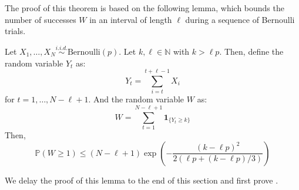 \documentclass{article}
\begin{document}
The proof of this theorem is based on the following lemma, which bounds the number of successes $W$ in an interval of length $\ell$ during a sequence of Bernoulli trials.  

\begin{lemma}\label{lem:bernoulli_trials}
    Let $X_1, \ldots, X_N \overset{i.i.d.}{\sim} \text{Bernoulli}(p)$. Let $k, \ell \in \mathbb{N}$ with $k > \ell p$. Then, define the random variable $Y_t$ as:
    \begin{equation*}
        Y_t = \sum_{i=t}^{t+\ell-1}X_i
    \end{equation*}
    for $t=1, \ldots, N-\ell+1$. And the random variable $W$ as:
    \begin{equation*}
        W = \sum_{t=1}^{N-\ell+1} \mathbf{1}_{\{Y_t\geq k\}}
    \end{equation*}
    Then,
    \begin{equation*}
        \mathbb{P}(W\geq 1)\leq (N-\ell+1)\exp\left(-\frac{(k-\ell p)^2}{2(\ell p + (k - \ell p ) / 3)}\right)
    \end{equation*}
\end{lemma}

We delay the proof of this lemma to the end of this section and first prove .  
\end{document}
